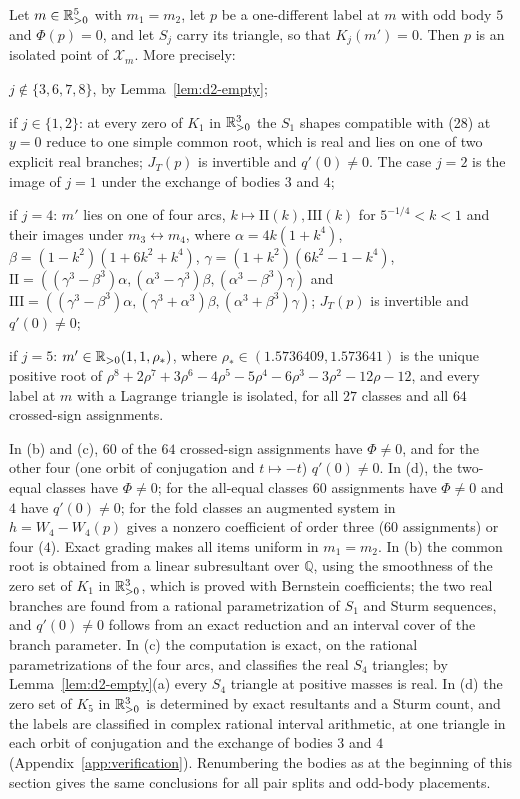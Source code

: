 \begin{lemma}\label{lem:d2-K}
Let $m\in\mathbb{R}_{>0}^5$ with $m_1=m_2$, let $p$ be a one-different label at $m$ with odd body $5$ and
$\Phi(p)=0$, and let $S_j$ carry its triangle, so that $K_j(m')=0$.  Then $p$ is an isolated
point of $\mathcal X_m$.  More precisely:
\begin{alphalist}
  \item $j\notin\{3,6,7,8\}$, by Lemma~\ref{lem:d2-empty};
  \item if $j\in\{1,2\}$: at every zero of $K_1$ in $\mathbb{R}_{>0}^3$ the $S_1$ shapes compatible with
  \textup{(28)} at $y=0$ reduce to one simple common root, which is real and lies on one of two
  explicit real branches; $J_T(p)$ is invertible and $q'(0)\ne0$.  The case $j=2$ is the image of
  $j=1$ under the exchange of bodies $3$ and $4$;
  \item if $j=4$: $m'$ lies on one of four arcs, $k\mapsto\mathrm{II}(k),\mathrm{III}(k)$ for
  $5^{-1/4}<k<1$ and their images under $m_3\leftrightarrow m_4$, where
  $\alpha=4k(1+k^4)$, $\beta=(1-k^2)(1+6k^2+k^4)$, $\gamma=(1+k^2)(6k^2-1-k^4)$,
  $\mathrm{II}=((\gamma^3-\beta^3)\alpha,(\alpha^3-\gamma^3)\beta,(\alpha^3-\beta^3)\gamma)$ and
  $\mathrm{III}=((\gamma^3-\beta^3)\alpha,(\gamma^3+\alpha^3)\beta,(\alpha^3+\beta^3)\gamma)$;
  $J_T(p)$ is invertible and $q'(0)\ne0$;
  \item if $j=5$: $m'\in\mathbb{R}_{>0}(1,1,\rho_*)$, where $\rho_*\in(1.5736409,1.573641)$ is the unique
  positive root of $\rho^8+2\rho^7+3\rho^6-4\rho^5-5\rho^4-6\rho^3-3\rho^2-12\rho-12$, and every
  label at $m$ with a Lagrange triangle is isolated, for all $27$ classes and all $64$
  crossed-sign assignments.
\end{alphalist}
\end{lemma}

In (b) and (c), $60$ of the $64$ crossed-sign assignments have $\Phi\ne0$, and for the other four
(one orbit of conjugation and $t\mapsto-t$) $q'(0)\ne0$.  In (d), the two-equal classes have
$\Phi\ne0$; for the all-equal classes $60$ assignments have $\Phi\ne0$ and $4$ have $q'(0)\ne0$;
for the fold classes an augmented system in $h=W_4-W_4(p)$ gives a nonzero coefficient of order
three ($60$ assignments) or four ($4$).  Exact grading makes all items uniform in $m_1=m_2$.
In (b) the common root is obtained from a linear subresultant over $\mathbb Q$, using the
smoothness of the zero set of $K_1$ in $\mathbb{R}_{>0}^3$, which is proved with Bernstein coefficients; the
two real branches are found from a rational parametrization of $S_1$ and Sturm sequences, and
$q'(0)\ne0$ follows from an exact reduction and an interval cover of the branch parameter.  In (c)
the computation is exact, on the rational parametrizations of the four arcs, and classifies the
real $S_4$ triangles; by Lemma~\ref{lem:d2-empty}(a) every $S_4$ triangle at positive masses is
real.  In (d) the zero set of $K_5$ in $\mathbb{R}_{>0}^3$ is determined by exact resultants and a Sturm
count, and the labels are classified in complex rational interval arithmetic, at one triangle in
each orbit of conjugation and the exchange of bodies $3$ and $4$
(Appendix~\ref{app:verification}).  Renumbering the bodies as at the beginning of this section
gives the same conclusions for all pair splits and odd-body placements.

